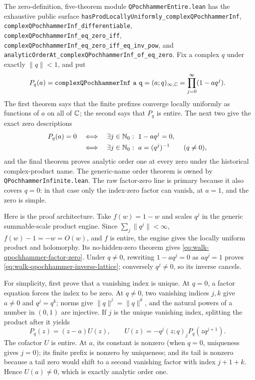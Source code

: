 \documentclass[11pt,oneside]{article}
\theoremstyle{definition}
\theoremstyle{remark}
\begin{document}
The zero-definition, five-theorem module
\nolinkurl{QPochhammerEntire.lean} has the exhaustive public surface
\nolinkurl{hasProdLocallyUniformly_complexQPochhammerInf},
\nolinkurl{complexQPochhammerInf_differentiable},
\nolinkurl{complexQPochhammerInf_eq_zero_iff},
\nolinkurl{complexQPochhammerInf_eq_zero_iff_eq_inv_pow}, and
\nolinkurl{analyticOrderAt_complexQPochhammerInf_of_eq_zero}.
Fix a complex \(q\) under exactly \(\lVert q\rVert<1\), and put
\[
 P_q(a)=\mathtt{complexQPochhammerInf\ a\ q}
       =(a;q)_{\infty,\mathbb{C}}
       =\prod_{j=0}^{\infty}(1-aq^j).
\]
The first theorem says that the finite prefixes converge locally uniformly as
functions of \(a\) on all of \(\mathbb{C}\); the second says that \(P_q\)
is entire.  The next two give the exact zero descriptions
\begin{align}
 P_q(a)=0
 &\quad\Longleftrightarrow\quad
   \exists j\in\NaturalNumbers:\ 1-aq^j=0,                 \label{eq:walk-qpochhammer-factor-zero}\\
 &\quad\Longleftrightarrow\quad
   \exists j\in\NaturalNumbers:\ a=(q^j)^{-1}
   \qquad(q\ne0),                                           \label{eq:walk-qpochhammer-inverse-lattice}
\end{align}
and the final theorem proves analytic order one at every zero under the
historical complex-product name.  The generic-name order theorem is owned by
\nolinkurl{QPochhammerInfinite.lean}.  The raw
factor-zero line is primary because it also covers \(q=0\): in that case only
the index-zero factor can vanish, at \(a=1\), and the zero is simple.

Here is the proof architecture.  Take \(f(w)=1-w\) and scales \(q^j\) in the
generic summable-scale product engine.  Since
\(\sum_j\lVert q^j\rVert<\infty\), \(f(w)-1=-w=O(w)\), and \(f\) is entire,
the engine gives the locally uniform product and holomorphy.  Its
no-hidden-zero theorem gives \eqref{eq:walk-qpochhammer-factor-zero}.  Under
\(q\ne0\), rewriting \(1-aq^j=0\) as \(aq^j=1\) proves
\eqref{eq:walk-qpochhammer-inverse-lattice}; conversely \(q^j\ne0\), so its
inverse cancels.

For simplicity, first prove that a vanishing index is unique.  At \(q=0\), a
factor equation forces the index to be zero.  At \(q\ne0\), two vanishing
indices \(j,k\) give \(a\ne0\) and \(q^j=q^k\); norms give
\(\lVert q\rVert^j=\lVert q\rVert^k\), and the natural powers of a number in
\((0,1)\) are injective.  If \(j\) is the unique vanishing index, splitting the
product after it yields
\[
 P_q(z)=(z-a)U(z),\qquad
 U(z)=-q^j(z;q)_jP_q(zq^{j+1}).
\]
The cofactor \(U\) is entire.  At \(a\), its constant is nonzero (when
\(q=0\), uniqueness gives \(j=0\)); its finite prefix is nonzero by uniqueness;
and its tail is nonzero because a tail zero would shift to a second vanishing
factor with index \(j+1+k\).  Hence \(U(a)\ne0\), which is exactly analytic
order one.
\end{document}
